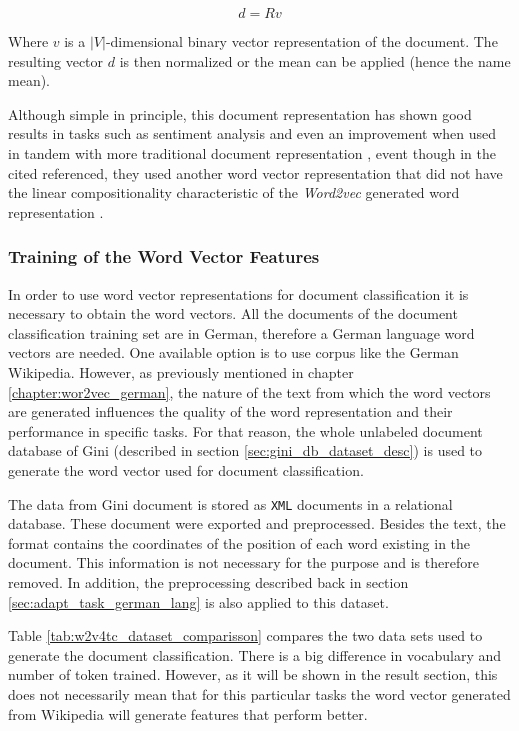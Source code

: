 $$d = Rv$$

Where $v$ is a $|V|$-dimensional  binary vector representation of the
document.   The resulting vector $d$ is then  normalized or the mean can be
applied (hence the name mean).


Although simple in principle, this document representation has  shown good
results in tasks  such as sentiment analysis and even an improvement when used in tandem
with more traditional document representation  \cite{maas2010probabilistic},
event though in the cited referenced, they used another word vector representation that
did not have the linear compositionality characteristic of the
\textit{Word2vec} generated word representation \cite{MikolovSCCD13}.


\subsubsection{Training of the Word Vector Features}
\label{sec:sub_w2v_4tc_training-word-vector}
In order to use word vector representations for  document classification it
is necessary to obtain the word vectors.  All the documents of the
document classification training set are in German, therefore  a German language word
vectors are needed.  One available option is to use  corpus like the German
Wikipedia. However, as previously mentioned in chapter
\ref{chapter:wor2vec_german}, the nature of the text from which the word
vectors are generated influences the quality of the word representation and their
performance in specific tasks. For that reason, the whole unlabeled document
database of Gini  (described in section \ref{sec:gini_db_dataset_desc})   is
used to generate the word vector used for document classification. 

The data from Gini document is stored as \texttt{XML} documents in a
relational database. These document were exported and preprocessed. Besides
the text, the format contains the coordinates of the position of each word
existing in the document. This information is not necessary for the purpose
and is therefore removed. In addition, the preprocessing described back in
section \ref{sec:adapt_task_german_lang} is also applied to this dataset.

Table \ref{tab:w2v4tc_dataset_comparisson} compares the two data sets used
to generate the document classification. There is a big difference in
vocabulary and number of token trained. However, as it will be shown in the result
section, this does not necessarily mean that for this particular tasks the
word vector generated from Wikipedia will generate features that perform better.

